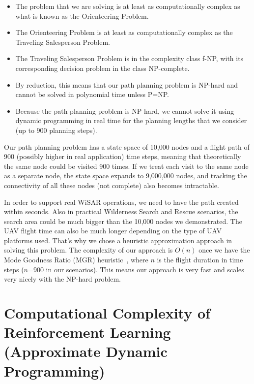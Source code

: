 \begin{itemize}
\item The problem that we are solving is at least as computationally complex as what is known as the Orienteering Problem.  
\item The Orienteering Problem is at least as computationally complex as the Traveling Salesperson Problem.
\item The Traveling Salesperson Problem is in the complexity class f-NP, with its corresponding decision problem in the class NP-complete.
\item By reduction, this means that our path planning problem is NP-hard and cannot be solved in polynomial time unless P=NP.
\item Because the path-planning problem is NP-hard, we cannot solve it using dynamic programming in real time for the planning lengths that we consider (up to 900 planning steps).
\end{itemize}


Our path planning problem has a state space of 10,000 nodes and a flight path of 900 (possibly higher in real application) time steps, meaning that theoretically the same node could be visited 900 times. If we treat each visit to the same node as a separate node, the state space expands to 9,000,000 nodes, and tracking the connectivity of all these nodes (not complete) also becomes intractable.

In order to support real WiSAR operations, we need to have the path created within seconds. Also in practical Wilderness Search and Rescue scenarios, the search area could be much bigger than the 10,000 nodes we demonstrated. The UAV flight time can also be much longer depending on the type of UAV platforms used. That's why we chose a heuristic approximation approach in solving this problem. The complexity of our approach is $O(n)$ once we have the Mode Goodness Ratio (MGR) heuristic~\cite{Lin2014Hierarchical}, where $n$ is the flight duration in time steps ($n$=900 in our scenarios). This means our approach is very fast and scales very nicely with the NP-hard problem.

\section{Computational Complexity of Reinforcement Learning (Approximate Dynamic Programming)}
\label{RLComplexity}

